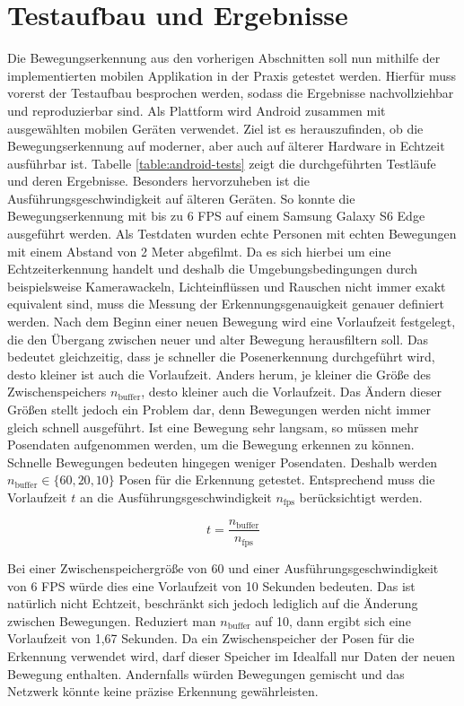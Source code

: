 \section{Testaufbau und Ergebnisse}
Die Bewegungserkennung aus den vorherigen Abschnitten soll nun mithilfe der
implementierten mobilen Applikation in der Praxis getestet werden. Hierfür muss
vorerst der Testaufbau besprochen werden, sodass die Ergebnisse nachvollziehbar
und reproduzierbar sind. Als Plattform wird Android zusammen mit ausgewählten
mobilen Geräten verwendet. Ziel ist es herauszufinden, ob die Bewegungserkennung
auf moderner, aber auch auf älterer Hardware in Echtzeit ausführbar ist. Tabelle
\ref{table:android-tests} zeigt die durchgeführten Testläufe und deren
Ergebnisse. Besonders hervorzuheben ist die Ausführungsgeschwindigkeit auf
älteren Geräten. So konnte die Bewegungserkennung mit bis zu 6 FPS auf einem
Samsung Galaxy S6 Edge ausgeführt werden. Als Testdaten wurden echte Personen
mit echten Bewegungen mit einem Abstand von 2 Meter abgefilmt. Da es sich
hierbei um eine Echtzeiterkennung handelt und deshalb die Umgebungsbedingungen
durch beispielsweise Kamerawackeln, Lichteinflüssen und Rauschen nicht immer
exakt equivalent sind, muss die Messung der Erkennungsgenauigkeit genauer
definiert werden. Nach dem Beginn einer neuen Bewegung wird eine Vorlaufzeit
festgelegt, die den Übergang zwischen neuer und alter Bewegung herausfiltern
soll. Das bedeutet gleichzeitig, dass je schneller die Posenerkennung
durchgeführt wird, desto kleiner ist auch die Vorlaufzeit. Anders herum, je
kleiner die Größe des Zwischenspeichers $n_\mathrm{buffer}$, desto kleiner auch
die Vorlaufzeit. Das Ändern dieser Größen stellt jedoch ein Problem dar, denn
Bewegungen werden nicht immer gleich schnell ausgeführt. Ist eine Bewegung sehr
langsam, so müssen mehr Posendaten aufgenommen werden, um die Bewegung erkennen
zu können. Schnelle Bewegungen bedeuten hingegen weniger Posendaten. Deshalb
werden $n_\mathrm{buffer} \in \{60, 20, 10\}$ Posen für die Erkennung getestet.
Entsprechend muss die Vorlaufzeit $t$ an die Ausführungsgeschwindigkeit
$n_\mathrm{fps}$ berücksichtigt werden. 

\begin{equation}\label{eq:preruntime}
    t = \frac{n_\mathrm{buffer}}{n_\mathrm{fps}}
\end{equation}

Bei einer Zwischenspeichergröße von 60 und einer Ausführungsgeschwindigkeit von
6 FPS würde dies eine Vorlaufzeit von 10 Sekunden bedeuten. Das ist natürlich
nicht Echtzeit, beschränkt sich jedoch lediglich auf die Änderung zwischen
Bewegungen. Reduziert man $n_\mathrm{buffer}$ auf 10, dann ergibt sich eine
Vorlaufzeit von 1,67 Sekunden. Da ein Zwischenspeicher der Posen für die
Erkennung verwendet wird, darf dieser Speicher im Idealfall nur Daten der neuen
Bewegung enthalten.  Andernfalls würden Bewegungen gemischt und das Netzwerk
könnte keine präzise Erkennung gewährleisten.


